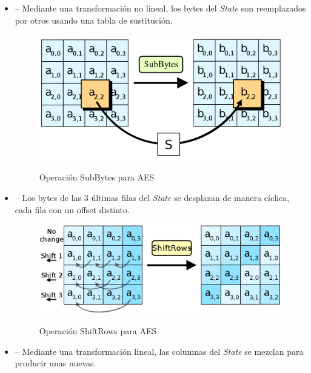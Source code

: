  \begin{itemize}
 \item {} -- Mediante una transformación no lineal,
 los bytes del \emph{State} son reemplazados por otros usando una tabla de sustitución.

 \begin{figure}[ht]
   \centering
   \includegraphics[scale=0.3]{Figures/SubBytes}
   \decoRule
   \caption[SubBytes (AES)]{Operación SubBytes para AES} \emph{\parencite{Reference27}}
   \label{fig:SubBytes}
 \end{figure}

 \item {} -- Los bytes de las 3 últimas filas del \emph{State}
 se desplazan de manera cíclica, cada fila con un offset distinto.

 \begin{figure}[ht]
   \centering
   \includegraphics[scale=0.3]{Figures/ShiftRows}
   \decoRule
   \caption[ShiftRows (AES)]{Operación ShiftRows para AES} \emph{\parencite{Reference28}}
   \label{fig:ShiftRows}
 \end{figure}

 \item {} -- Mediante una transformación lineal,
 las columnas del \emph{State} se mezclan para producir unas nuevas.


\end{itemize}

